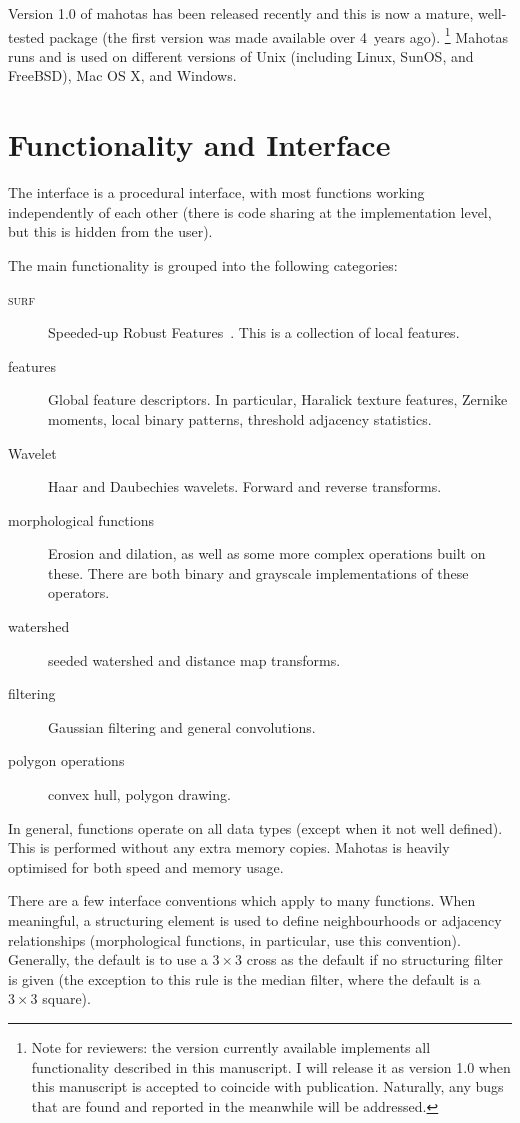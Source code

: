 \documentclass{article}
\begin{document}
Version 1.0 of mahotas has been released recently and this is now a mature,
well-tested package (the first version was made available over 4~years ago).
\footnote{Note for reviewers: the version currently available implements all
functionality described in this manuscript. I will release it as version 1.0
when this manuscript is accepted to coincide with publication. Naturally, any
bugs that are found and reported in the meanwhile will be addressed.} Mahotas
runs and is used on different versions of Unix (including Linux, SunOS, and
FreeBSD), Mac OS X, and Windows.

\section{Functionality and Interface}

The interface is a procedural interface, with most functions working
independently of each other (there is code sharing at the implementation
level, but this is hidden from the user).

The main functionality is grouped into the following categories:

\begin{description}
\item[\textsc{surf}] Speeded-up Robust Features~\citep{eth_biwi_00517}. This is
a collection of local features.
\item[features] Global feature descriptors. In particular, Haralick texture
features, Zernike moments, local binary patterns, threshold adjacency
statistics.
\item[Wavelet] Haar and Daubechies wavelets. Forward and reverse transforms.
\item[morphological functions] Erosion and dilation, as well as some more
complex operations built on these. There are both binary and grayscale
implementations of these operators.
\item[watershed] seeded watershed and distance map transforms.
\item[filtering] Gaussian filtering and general convolutions.
\item[polygon operations] convex hull, polygon drawing.
\end{description}

In general, functions operate on all data types (except when it not well
defined). This is performed without any extra memory copies. Mahotas is heavily
optimised for both speed and memory usage.

There are a few interface conventions which apply to many functions. When
meaningful, a structuring element is used to define neighbourhoods or adjacency
relationships (morphological functions, in particular, use this convention).
Generally, the default is to use a $3 \times 3$ cross as the
default if no structuring filter is given (the exception to this rule is the
median filter, where the default is a $3 \times 3$ square).
\end{document}
